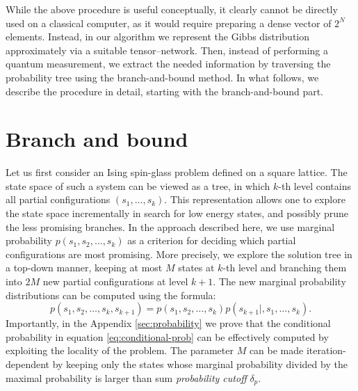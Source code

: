 While the above procedure is useful conceptually, it clearly cannot be directly
used on a classical computer, as it would require preparing a dense vector of
$2^{N}$ elements. Instead, in our algorithm we represent the Gibbs distribution
approximately via a suitable tensor--network. Then, instead of performing a
quantum measurement, we extract the needed information by traversing the
probability tree using the branch-and-bound method. In what follows, we
describe the procedure in detail, starting with the branch-and-bound
part.

\section{Branch and bound}
Let us first consider an Ising spin-glass problem defined on a square lattice.
The state space of such a
system can be viewed as a tree, in which $k$-th level contains all partial
configurations $(s_1, \ldots, s_k)$. This representation allows one to explore
the state space incrementally in search for low energy states, and possibly
prune the less promising branches. In the approach described here, we use
marginal probability $p(s_1, s_2, \ldots, s_k)$ as a criterion for deciding
which partial configurations are most promising. More precisely, we explore the
solution tree in a top-down manner, keeping at most $M$ states at $k$-th level
and branching them into $2M$ new partial configurations at level $k+1$. The
new marginal probability distributions can be computed using the formula:
\begin{equation}
  \label{eq:conditional-prob}
  p(s_1, s_2, \ldots, s_k, s_{k+1}) = p(s_1, s_2, \ldots, s_k)p(s_{k+1}|, s_1, \ldots, s_k).
\end{equation}
Importantly, in the Appendix \ref{sec:probability} we prove that the conditional
probability in equation \eqref{eq:conditional-prob} can be effectively computed
by exploiting the locality of the problem. The parameter $M$ can be made iteration-dependent by keeping only the states
whose marginal probability divided by the maximal probability is larger than
sum \emph{probability cutoff} $\delta_{p}$.

